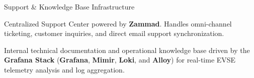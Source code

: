 \documentclass[aspectratio=169]{beamer}
\begin{document}
\begin{frame}{Support \& Knowledge Base Infrastructure}
    \begin{tcolorbox}[
        colback=circle_bg, colframe=primary, title=1. support.ai-charge.com / support@ai-charge.com,
        width=\linewidth, boxrule=1pt, arc=1mm,
        left=3mm, right=3mm, top=2mm, bottom=2mm,
        boxsep=0mm, before skip=0mm, after skip=4mm
    ]
    \small
    Centralized Support Center powered by \textbf{Zammad}. Handles omni-channel ticketing, customer inquiries, and direct email support synchronization.
    \end{tcolorbox}
    
    \begin{tcolorbox}[
        colback=circle_bg, colframe=secondary, title=2. Knowledge Base \& Telemetry,
        width=\linewidth, boxrule=1pt, arc=1mm,
        left=3mm, right=3mm, top=2mm, bottom=2mm,
        boxsep=0mm, before skip=0mm, after skip=0mm
    ]
    \small
    Internal technical documentation and operational knowledge base driven by the \textbf{Grafana Stack} (\textbf{Grafana}, \textbf{Mimir}, \textbf{Loki}, and \textbf{Alloy}) for real-time EVSE telemetry analysis and log aggregation.
    \end{tcolorbox}
\end{frame}
\end{document}
